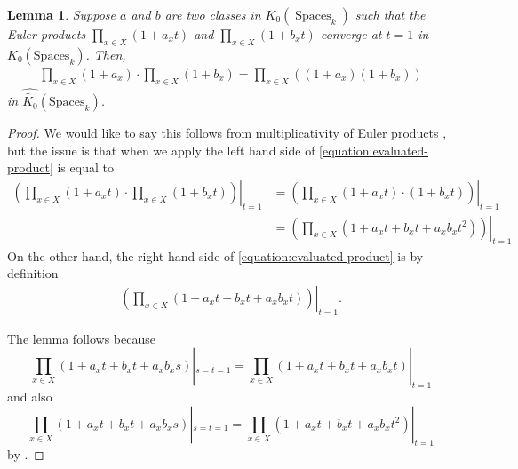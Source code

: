 \documentclass[12 pt]{amsart}
\theoremstyle{plain}
\newtheorem{lemma}[theorem]{Lemma}
\theoremstyle{definition}
\theoremstyle{remark}
\numberwithin{equation}{section}
\newcommand\grSpaces{K_0(\mathrm{Spaces}_k)} %
\newcommand\grcSpaces{\widehat{\widetilde{K_0}}(\mathrm{Spaces}_k)} %
\newcommand{\on}[1]{\operatorname{#1}}
\begin{document}
\begin{lemma} \label{lemma:evaluated-product} Suppose $a$ and $b$ are two
	classes in $K_0(\on{Spaces}_k)$  
	such that the Euler products $\prod_{x \in X}
	\left( 1 + a_x t \right)$ and $\prod_{x \in X} \left( 1 + b_x t \right)$
	converge at $t = 1$ in $\grSpaces$.  Then, \begin{align}
		\label{equation:evaluated-product} \prod_{x \in X} \left( 1 +
		a_x \right) \cdot \prod_{x \in X} \left( 1 + b_x \right) =
		\prod_{x \in X} \left( \left( 1 + a_x \right) \left( 1 + b_x
		\right)\right) \end{align} in $\grcSpaces$.  \end{lemma}
		\begin{proof} 
			We would like to say this follows from
			multiplicativity of Euler products \cite[Prop.\
			3.9.2.4]{bilu:thesis}, but the issue is that when we
			apply
			\cite[Prop.\ 3.9.2.4]{bilu:thesis}
                the left hand side of
			\eqref{equation:evaluated-product} is equal to
			\begin{equation}
			\begin{aligned} \label{equation:motivic-product-commute}
				\left. \left(\prod_{x \in X} \left( 1 + a_x t
					\right) \cdot \prod_{x \in X} \left( 1
				+ b_x t\right) \right) \right \rvert_{t = 1} &=
				\left. \left( \prod_{x \in X} \left( 1 + a_x t
					\right) \cdot \left( 1 + b_x t\right)
				\right) \right \rvert_{t = 1} \\ &= \left.
				\left( \prod_{x \in X} \left( 1 + a_x t  + b_x
			t + a_x b_x t^2 \right) \right) \right \rvert_{t = 1}
		\end{aligned}
	\end{equation}
On the other hand, the right hand side of 
\eqref{equation:evaluated-product}
is by definition
		\begin{align} \label{equation:motivic-final-product} \left.
			\left( \prod_{x \in X} \left( 1 + a_x t  + b_x t + a_x
		b_x t \right) \right) \right \rvert_{t = 1}.  \end{align}

The lemma follows because
  $$\prod_{x \in X} \left( 1 + a_x t  + b_x t
		+ a_x b_x s \right)|_{s=t=1}
  =\prod_{x \in X} \left( 1 + a_x t  + b_x t
		+ a_x b_x t \right)|_{t=1}
  $$
and also 
$$\prod_{x \in X} \left( 1 + a_x t  + b_x t
		+ a_x b_x s \right)|_{s=t=1}
  =\prod_{x \in X} \left( 1 + a_x t  + b_x t
		+ a_x b_x t^2 \right)|_{t=1}
  $$ by \cite[Lemma 6.5.1]{biluH:motivic-euler-products-in-motivic-statistics}.
\end{proof}
\end{document}
